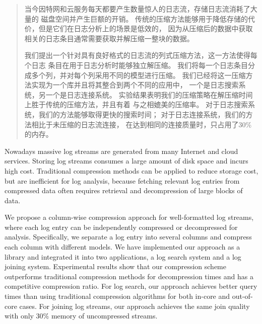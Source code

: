 
\begin{abstract}
	当今因特网和云服务每天都要产生数量惊人的日志流，存储日志流消耗了大量的
	磁盘空间并产生巨额的开销。
	传统的压缩方法能够用于降低存储的代价，但是它们在日志分析上的场景是低效的，
	因为从压缩后的数据中获取相关的日志条目通常需要获取并解压缩一整块的数据。
	
	我们提出一个针对具有良好格式的日志流的列式压缩方法，这一方法使得每个日志
	条目在用于日志分析时能够独立解压缩。
	我们将每一个日志条目分成多个列，并对每个列采用不同的模型进行压缩。
	我们已经将这一压缩方法实现为一个库并且将其整合到两个不同的应用中，
	一个是日志搜索系统，另一个是日志连接系统。
	实验结果表明我们的压缩策略在解压缩时间上胜于传统的压缩方法，并且有着
	与之相媲美的压缩率。
	对于日志搜索系统，我们的方法能够取得更快的搜索时间；
	对于日志连接系统，我们的方法相比于未压缩的日志流连接，
	在达到相同的连接质量时，只占用了30\%的内存。
	
\end{abstract}

\begin{englishabstract}

	Nowadays massive log streams are generated from many Internet and cloud services.
	Storing log streams consumes a large amount of disk space and incurs high cost.
	Traditional compression methods can be applied to reduce storage cost,
	but are inefficient for log analysis, because fetching relevant log entries
	from compressed data often requires retrieval and decompression of large blocks of data.
	
	We propose a column-wise compression approach for well-formatted log streams,
	where each log entry can be independently compressed or decompressed for analysis. 
	Specifically, we separate a log entry into several columns and compress each
	column with different models. 
	We have implemented our approach as a library and integrated it into two applications, 
	a log search system and a log joining system.
	Experimental results show that our compression scheme outperforms traditional
	compression methods for decompression times and has a competitive compression ratio.
	For log search, our approach achieves better query times
	than using traditional compression algorithms for both in-core and out-of-core cases.  
	For joining log streams, our approach achieves the same join quality with only
	30\% memory of uncompressed streams.
	
\end{englishabstract}
